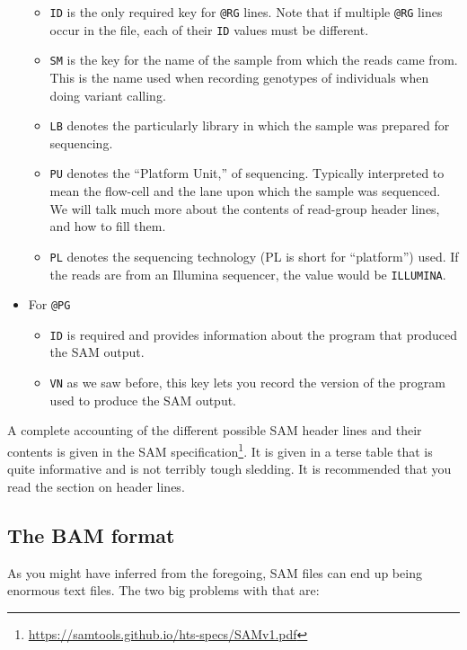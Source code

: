 \documentclass[]{krantz}
\providecommand{\tightlist}{%
  \setlength{\itemsep}{0pt}\setlength{\parskip}{0pt}}
\renewcommand{\href}[2]{#2\footnote{\url{#1}}}
\begin{document}
\begin{itemize}
  \begin{itemize}
  \tightlist
  \item
    \texttt{ID} is the only required key for \texttt{@RG} lines. Note that if multiple \texttt{@RG} lines occur in the file,
    each of their \texttt{ID} values must be different.
  \item
    \texttt{SM} is the key for the name of the sample from which the reads came from. This is the name
    used when recording genotypes of individuals when doing variant calling.
  \item
    \texttt{LB} denotes the particularly library in which the sample was prepared for sequencing.
  \item
    \texttt{PU} denotes the ``Platform Unit,'' of sequencing. Typically interpreted to mean the flow-cell and
    the lane upon which the sample was sequenced. We will talk much more about the contents of read-group
    header lines, and how to fill them.
  \item
    \texttt{PL} denotes the sequencing technology (PL is short for ``platform'') used. If the reads are from
    an Illumina sequencer, the value would be \texttt{ILLUMINA}.
  \end{itemize}
\item
  For \texttt{@PG}

  \begin{itemize}
  \tightlist
  \item
    \texttt{ID} is required and provides information about the program that produced the SAM output.
  \item
    \texttt{VN} as we saw before, this key lets you record the version of the program used to produce the
    SAM output.
  \end{itemize}
\end{itemize}

A complete accounting of the different possible SAM header lines and their contents is given
in the \href{https://samtools.github.io/hts-specs/SAMv1.pdf}{SAM specification}. It is given in a
terse table that is quite informative and is not terribly tough sledding. It is recommended that
you read the section on header lines.

\hypertarget{the-bam-format}{%
\subsection{The BAM format}\label{the-bam-format}}

As you might have inferred from the foregoing, SAM files can end up being enormous
text files. The two big problems with that are:
\end{document}
